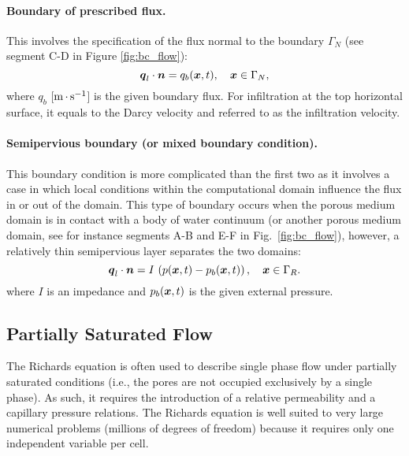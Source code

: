 \paragraph{Boundary of prescribed flux.}
This involves the specification of the flux normal to the boundary $\Gamma_N$
(see segment C-D in Figure \ref{fig:bc_flow}):
\begin{equation}
\label{eq:BC flux Darcy FS} 
  {\boldsymbol{q}}_l\cdot \boldsymbol{n} = q_{b}({\boldsymbol{x}},t), \quad {\boldsymbol{x}} \in \Gamma_N,
\end{equation}
where $q_b$ [${\rm m}{\,\cdot\,}{\rm s}^{-1}$] is the given boundary flux. 
For infiltration at the top horizontal surface, it equals to the Darcy velocity
and referred to as the infiltration velocity.

\paragraph{Semipervious boundary (or mixed boundary condition).}
This boundary condition is more complicated than the first two as it involves a case 
in which local conditions within the computational domain influence the flux in or 
out of the domain.
This type of boundary occurs when the porous medium domain is in contact with 
a body of water continuum (or another porous medium domain, see for instance segments 
A-B and E-F in Fig.~\ref{fig:bc_flow}), however, a relatively thin semipervious layer 
separates the two domains:
\begin{equation}
\label{eq:BC semipervious Darcy FS}
  {\boldsymbol{q}}_l \cdot \boldsymbol{n} = I\, \left(p ({\boldsymbol{x}},t) - p_{b}({\boldsymbol{x}},t) \right), \quad {\boldsymbol{x}} \in \Gamma_R.
\end{equation}
where $I$ is an impedance and $p_{b}({\boldsymbol{x}},t)$ is the given external pressure.



\clearpage


\subsection{Partially Saturated Flow}
\label{sec:richards-equation}

The Richards equation is often used to describe single phase flow under partially 
saturated conditions (i.e., the pores are not occupied exclusively by a single phase).  
As such, it requires the introduction of a relative permeability and a capillary 
pressure relations. %
The Richards equation is well suited to very large numerical problems (millions of 
degrees of freedom) because it requires only one independent variable per cell.


